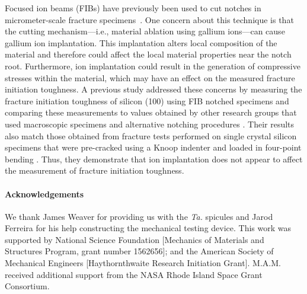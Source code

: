 \documentclass[12pt,onecolumn]{article}
\makeatletter
\newcommand{\TA}{\textit{Ta.\@}\xspace}
\makeatother
\begin{document}
\begin{bibunit}
Focused ion beams (FIBs) have previously been used to cut notches in micrometer-scale fracture specimens~\cite{jaya2015can,fett2008fracture,ochiai2014fracture,morishita2006fracture}.  One concern about this technique is that the cutting mechanism---i.e., material ablation using gallium ions---can cause gallium ion implantation. This implantation alters local composition of the material and therefore could affect the local material properties near the notch root. Furthermore, ion implantation could result in the generation of compressive stresses within the material, which may have an effect on the measured fracture initiation toughness. A previous study \cite{jaya2015can} addressed these concerns by measuring the fracture initiation toughness of silicon (100) using FIB notched specimens and comparing these measurements to values obtained by other research groups that used macroscopic specimens and alternative notching procedures \cite{ritchie2003failure}. Their results also match those obtained from fracture tests performed on single crystal silicon specimens that were pre-cracked using a Knoop indenter and loaded in four-point bending \cite{chen1980fracture}. Thus, they demonstrate that ion implantation does not appear to affect the measurement of fracture initiation toughness.

\singlespacing


\paragraph{Acknowledgements} %

We thank James Weaver for providing us with the \TA spicules and Jarod Ferreira for his help constructing the mechanical testing device. This work was supported by National Science Foundation [Mechanics of Materials and Structures Program, grant number 1562656]; and the American Society of Mechanical Engineers [Haythornthwaite Research Initiation Grant]. M.A.M. received additional support from the NASA Rhode Island Space Grant Consortium.



\end{bibunit}
\end{document}
